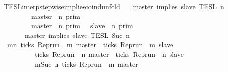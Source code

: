 \begin{isabellebody}
%
\isadelimproof
\isanewline
%
\endisadelimproof
\isanewline
{}\isamarkupfalse%
\ TESL{\isacharunderscore}interp{\isacharunderscore}stepwise{\isacharunderscore}implies{\isacharunderscore}coind{\isacharunderscore}unfold{\isacharcolon}\isanewline
\ \ {\isacartoucheopen}{\isasymlbrakk}\ master\ implies\ slave\ {\isasymrbrakk}\isactrlsub T\isactrlsub E\isactrlsub S\isactrlsub L\isactrlbsup {\isasymge}\ n\isactrlesup \ {\isacharequal}\isanewline
\ \ \ \ \ {\isacharparenleft}\ \ \ {\isasymlbrakk}\ master\ {\isasymnot}{\isasymUp}\ n\ {\isasymrbrakk}\isactrlsub p\isactrlsub r\isactrlsub i\isactrlsub m\ \ \ \ \ \ \ \ \ \ \ \ \ \ \ \ \ \ \ \ \ %
\isanewline
\ \ \ \ \ \ \ {\isasymunion}\ {\isasymlbrakk}\ master\ {\isasymUp}\ n\ {\isasymrbrakk}\isactrlsub p\isactrlsub r\isactrlsub i\isactrlsub m\ {\isasyminter}\ {\isasymlbrakk}\ slave\ {\isasymUp}\ n\ {\isasymrbrakk}\isactrlsub p\isactrlsub r\isactrlsub i\isactrlsub m{\isacharparenright}\ \ %
\isanewline
\ \ \ \ \ {\isasyminter}\ {\isasymlbrakk}\ master\ implies\ slave\ {\isasymrbrakk}\isactrlsub T\isactrlsub E\isactrlsub S\isactrlsub L\isactrlbsup {\isasymge}\ Suc\ n\isactrlesup {\isacartoucheclose}\isanewline
%
\isadelimproof
%
\endisadelimproof
%
\isatagproof
{}\isamarkupfalse%
\ {\isacharminus}\isanewline
\ \ \isamarkupfalse%
\ {\isacartoucheopen}{\isacharbraceleft}{\isasymrho}{\isachardot}\ {\isasymforall}m{\isasymge}n{\isachardot}\ ticks\ {\isacharparenleft}{\isacharparenleft}Rep{\isacharunderscore}run\ {\isasymrho}{\isacharparenright}\ m\ master{\isacharparenright}\ {\isasymlongrightarrow}\ ticks\ {\isacharparenleft}{\isacharparenleft}Rep{\isacharunderscore}run\ {\isasymrho}{\isacharparenright}\ m\ slave{\isacharparenright}{\isacharbraceright}\isanewline
\ \ \ \ \ \ \ \ {\isacharequal}\ {\isacharbraceleft}{\isasymrho}{\isachardot}\ ticks\ {\isacharparenleft}{\isacharparenleft}Rep{\isacharunderscore}run\ {\isasymrho}{\isacharparenright}\ n\ master{\isacharparenright}\ {\isasymlongrightarrow}\ ticks\ {\isacharparenleft}{\isacharparenleft}Rep{\isacharunderscore}run\ {\isasymrho}{\isacharparenright}\ n\ slave{\isacharparenright}{\isacharbraceright}\isanewline
\ \ \ \ \ \ \ \ {\isasyminter}\ {\isacharbraceleft}{\isasymrho}{\isachardot}\ {\isasymforall}m{\isasymge}Suc\ n{\isachardot}\ ticks\ {\isacharparenleft}{\isacharparenleft}Rep{\isacharunderscore}run\ {\isasymrho}{\isacharparenright}\ m\ master{\isacharparenright}\isanewline

\end{isabellebody}
